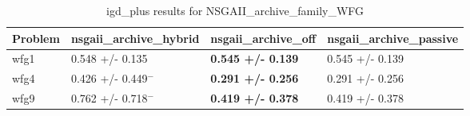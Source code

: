 \begin{table}
\caption{igd_plus results for NSGAII_archive_family_WFG}
\label{NSGAII_archive_family_WFG_igd_plus}
\begin{tabular}{llll}
\toprule
Problem & nsgaii_archive_hybrid & nsgaii_archive_off & nsgaii_archive_passive \\
\midrule
wfg1 & 0.548 +/- 0.135 & \textbf{0.545 +/- 0.139} & 0.545 +/- 0.139 \\
wfg4 & 0.426 +/- 0.449$^{-}$ & \textbf{0.291 +/- 0.256} & 0.291 +/- 0.256 \\
wfg9 & 0.762 +/- 0.718$^{-}$ & \textbf{0.419 +/- 0.378} & 0.419 +/- 0.378 \\
\bottomrule
\end{tabular}
\end{table}

